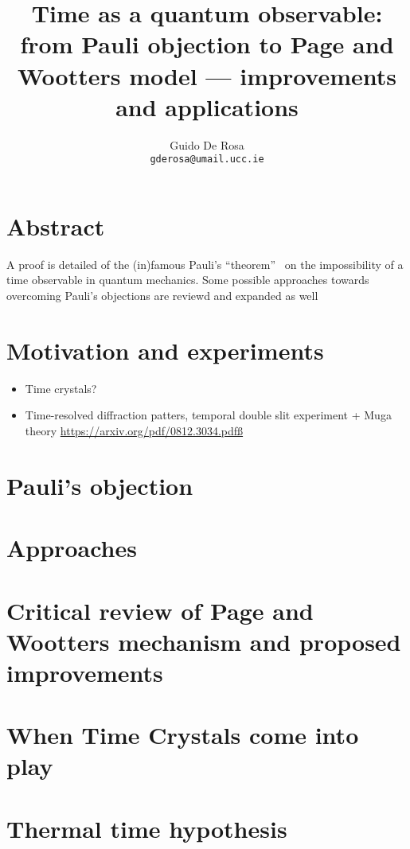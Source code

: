 \documentclass{book}
\author{Guido De Rosa \\ \small\tt{gderosa@umail.ucc.ie}}
\title{Time as a quantum observable: from Pauli objection to Page and Wootters model --- improvements and applications}
\begin{document}
\maketitle

\tableofcontents

\chapter*{Abstract}
A proof is detailed of the (in)famous Pauli's ``theorem''~\cite{PauliFootnote}
on the impossibility of a time observable in quantum mechanics. Some possible
approaches towards overcoming Pauli's objections are reviewd and expanded as well

\chapter{Motivation and experiments}
\begin{itemize}
  \item Time crystals?
  \item Time-resolved diffraction patters, temporal double slit experiment + Muga theory \url{https://arxiv.org/pdf/0812.3034.pdfß}
\end{itemize}

\chapter{Pauli's objection}



\chapter{Approaches}


\chapter{Critical review of Page and Wootters mechanism and proposed improvements}



\chapter{When Time Crystals come into play}


\chapter{Thermal time hypothesis}

\end{document}
